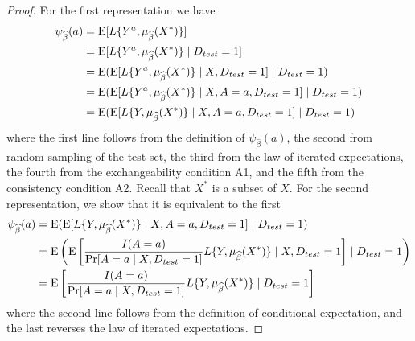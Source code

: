     \begin{proof}
        For the first representation we have 
        \begin{align*}
            \psi_{\widehat{\beta}}(a) &= \operatorname{E}[L\{Y^{a}, \mu_{\widehat{\beta}}(X^*)\}] \\
            & = \operatorname{E}[L\{Y^{a}, \mu_{\widehat{\beta}}(X^*)\}\mid D_{test} = 1] \\
            & = \operatorname{E}(\operatorname{E}[L\{Y^{a}, \mu_{\widehat{\beta}}(X^*)\}\mid X, D_{test} = 1] \mid D_{test} = 1) \\
            & = \operatorname{E}(\operatorname{E}[L\{Y^{a}, \mu_{\widehat{\beta}}(X^*)\}\mid X, A = a, D_{test} = 1] \mid D_{test} = 1) \\
            & = \operatorname{E}(\operatorname{E}[L\{Y, \mu_{\widehat{\beta}}(X^*)\}\mid X, A = a, D_{test} = 1] \mid D_{test} = 1) 
        \end{align*}
        where the first line follows from the definition of $\psi_{\widehat{\beta}}(a)$, the second from random sampling of the test set, the third from the law of iterated expectations, the fourth from the exchangeability condition A1, and the fifth from the consistency condition A2. Recall that $X^*$ is a subset of $X$. For the second representation, we show that it is equivalent to the first 
        \begin{align*}
            \psi_{\widehat{\beta}}(a) &= \operatorname{E}(\operatorname{E}[L\{Y, \mu_{\widehat{\beta}}(X^*)\}\mid X,A = a, D_{test} = 1] \mid D_{test} = 1) \\
            &= \operatorname{E}\left(\operatorname{E}\left[\frac{I(A = a)}{\Pr[A = a \mid X,D_{test} = 1]}L\{Y, \mu_{\widehat{\beta}}(X^*)\} \mid X,D_{test} = 1\right] \mid D_{test} = 1\right)\\
            &= \operatorname{E}\left[\frac{I(A = a)}{\Pr[A = a \mid X,D_{test} = 1]}L\{Y, \mu_{\widehat{\beta}}(X^*)\} \mid D_{test} = 1\right]
        \end{align*}
        where the second line follows from the definition of conditional expectation, and the last reverses the law of iterated expectations.
    \end{proof}
    
